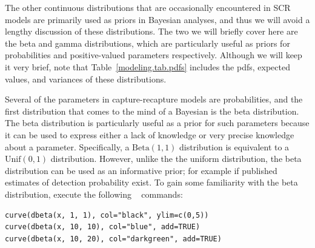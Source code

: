 The other continuous distributions that are occasionally encountered in SCR
models are %
primarily used as priors in Bayesian analyses, and thus we will avoid
a lengthy discussion of these distributions. The two we will briefly
cover here are the beta and gamma distributions, which are
particularly useful as priors for probabilities and positive-valued
parameters respectively. Although we will keep it very brief, note that
Table~\ref{modeling.tab.pdfs} includes
the pdfs, expected values, and variances of these distributions.

Several of the parameters in capture-recapture models are
probabilities, and the first distribution that comes to the mind of a
Bayesian is the beta distribution. %
The beta distribution is particularly useful as
a prior for such parameters because it can be used to express either a
lack of knowledge or very precise knowledge about a
parameter. Specifically, a $\text{Beta}(1,1)$ distribution is
equivalent to a $\text{Unif}(0, 1)$ distribution. However, unlike the
the uniform distribution, the beta distribution can be used as an
informative prior; for example if published estimates of detection
probability exist. To gain some familiarity with the beta
distribution, execute the following \R~ commands:
\begin{verbatim}
curve(dbeta(x, 1, 1), col="black", ylim=c(0,5))
curve(dbeta(x, 10, 10), col="blue", add=TRUE)
curve(dbeta(x, 10, 20), col="darkgreen", add=TRUE)
\end{verbatim}

